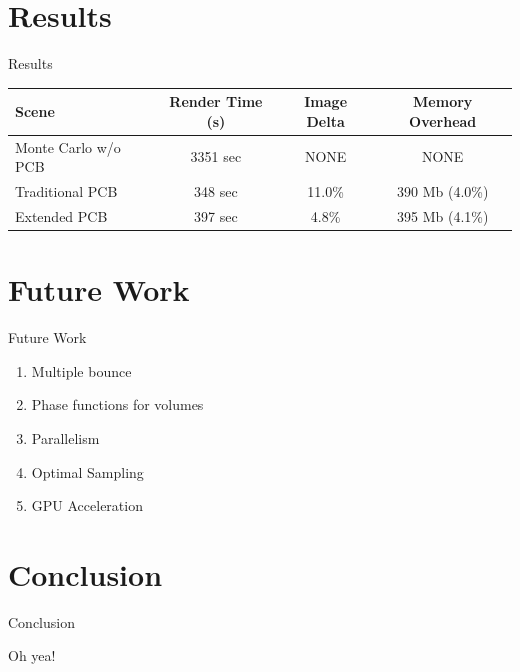 \documentclass[compress,professionalfont]{beamer}
\begin{document}
\section{Results}
\begin{frame}{Results}

    \begin{center}
    \setlength{\tabcolsep}{5pt}
    \begin{tabular}{ | l | c | c | c | }
      \hline                       
      Scene & Render Time (s) & Image Delta & Memory Overhead \\
      \hline                  
      Monte Carlo w/o PCB & 3351 sec & NONE & NONE \\
      Traditional PCB & 348 sec & 11.0\% & 390 Mb (4.0\%) \\
      Extended PCB & 397 sec & 4.8\% & 395 Mb (4.1\%)  \\
      \hline  
    \end{tabular}
    \end{center}

\end{frame}




\section{Future Work}
\begin{frame}{Future Work}

    \begin{enumerate}
        \item Multiple bounce
        \item Phase functions for volumes
        \item Parallelism
        \item Optimal Sampling
        \item GPU Acceleration
    \end{enumerate}

\end{frame}




\section{Conclusion}
\begin{frame}{Conclusion}

    Oh yea!

\end{frame}
\end{document}
